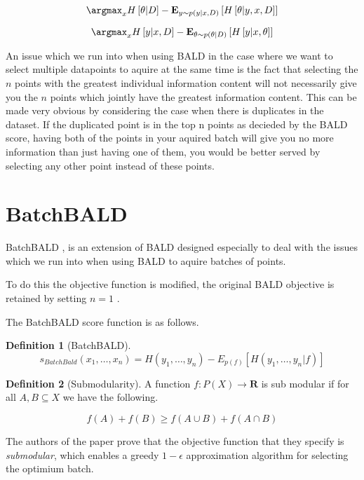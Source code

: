 \documentclass[12pt, a4paper]{report}
\theoremstyle{definition}
\newtheorem{definition}{Definition}[section]
\begin{document}
$${\argmax}_x H \left[ \theta | D \right] - \mathbf{E}_{y \sim p(y | x, D)} \left[ H\left[ \theta | y, x, D\right]\right]$$

$${\argmax}_x H \left[ y | x, D \right] - \mathbf{E}_{\theta \sim p(\theta | D)} \left[ H\left[ y | x, \theta \right]\right]$$


An issue which we run into when using BALD in the case where we want to select multiple datapoints to aquire at the same time is the fact that selecting the $n$ points with the greatest individual information content will not necessarily give you the $n$ points which jointly have the greatest information content. This can be made very obvious by considering the case when there is duplicates in the dataset. If the duplicated point is in the top n points as decieded by the BALD score, having both of the points in your aquired batch will give you no more information than just having one of them, you would be better served by selecting any other point instead of these points.

\section{BatchBALD}
BatchBALD \cite{kirsch2019batchbald}, is an extension of BALD designed especially to deal with the issues which we run into when using BALD to aquire batches of points.

To do this the objective function is modified, the original BALD objective is retained by setting $n = 1$ .

The BatchBALD score function is as follows.


\begin{definition}[BatchBALD]
    $$s_{BatchBald} (x_1, \ldots, x_n) = H(y_1, \ldots, y_n) - E_{p(f)}\left[H(y_1, \ldots, y_n | f)\right]$$
\end{definition}


\begin{definition}[Submodularity]
    A function $f : P(X) \rightarrow \mathbf{R}$ is sub modular if for all $A,B \subseteq X$ we have the following.

    $$f(A) + f(B) \geq f\left( A \cup B \right) +  f\left(A \cap B \right) $$
\end{definition}

The authors of the paper prove that the objective function that they specify is \textit{submodular}, which enables a greedy $1 - \epsilon$ approximation algorithm for selecting the optimium batch.
\end{document}
